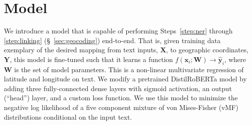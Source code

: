 \documentclass[11pt,a4paper]{article}
\begin{document}
\section{Model}

We introduce a model that is capable of performing Steps~\ref{step:ner} through \ref{step:linking} (\S~\ref{sec:geocoding}) end-to-end. That is, given training data exemplary of the desired mapping from text inputs, $\textbf{X}$, to geographic coordinates, $\textbf{Y}$, this model is fine-tuned such that it learns a function $f(\textbf{x}_i; \textbf{W}) \rightarrow \hat{\textbf{y}}_i$, where $\textbf{W}$ is the set of model parameters. This is a non-linear multivariate regression of latitude and longitude on text. We modify a pretrained DistilRoBERTa model by adding three fully-connected dense layers with sigmoid activation, an output (``head'') layer, and a custom loss function. We use this model to minimize the negative log likelihood of a five component mixture of von Mises-Fisher (vMF) distributions conditional on the input text.



\end{document}

